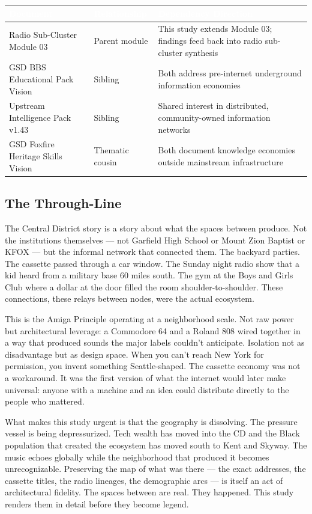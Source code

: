 \documentclass[11pt,letterpaper]{article}
\newcommand{\tableheader}[1]{\textbf{\sffamily\textcolor{white}{#1}}}
\begin{document}
\begin{center}
\begin{tabularx}{\textwidth}{L{4cm}L{3cm}X}
\toprule
{}
\tableheader{Document} & \tableheader{Relationship} & \tableheader{Dependency Direction} \\
\midrule
Radio Sub-Cluster Module 03 & Parent module & This study extends Module 03; findings feed back into radio sub-cluster synthesis \\
GSD BBS Educational Pack Vision & Sibling & Both address pre-internet underground information economies \\
Upstream Intelligence Pack v1.43 & Sibling & Shared interest in distributed, community-owned information networks \\
GSD Foxfire Heritage Skills Vision & Thematic cousin & Both document knowledge economies outside mainstream infrastructure \\
\bottomrule
\end{tabularx}
\end{center}

\subsection{The Through-Line}

The Central District story is a story about what the spaces between produce. Not the institutions themselves --- not Garfield High School or Mount Zion Baptist or KFOX --- but the informal network that connected them. The backyard parties. The cassette passed through a car window. The Sunday night radio show that a kid heard from a military base 60 miles south. The gym at the Boys and Girls Club where a dollar at the door filled the room shoulder-to-shoulder. These connections, these relays between nodes, were the actual ecosystem.

This is the Amiga Principle operating at a neighborhood scale. Not raw power but architectural leverage: a Commodore 64 and a Roland 808 wired together in a way that produced sounds the major labels couldn't anticipate. Isolation not as disadvantage but as design space. When you can't reach New York for permission, you invent something Seattle-shaped. The cassette economy was not a workaround. It was the first version of what the internet would later make universal: anyone with a machine and an idea could distribute directly to the people who mattered.

What makes this study urgent is that the geography is dissolving. The pressure vessel is being depressurized. Tech wealth has moved into the CD and the Black population that created the ecosystem has moved south to Kent and Skyway. The music echoes globally while the neighborhood that produced it becomes unrecognizable. Preserving the map of what was there --- the exact addresses, the cassette titles, the radio lineages, the demographic arcs --- is itself an act of architectural fidelity. The spaces between are real. They happened. This study renders them in detail before they become legend.
\end{document}
